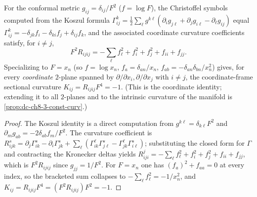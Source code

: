 \begin{lemma}
  \label{lem:dc-ch8-3-conformal-curvature}
  \leanok
  For the conformal metric $g_{ij}=\delta_{ij}/F^2$ ($f=\log F$), the Christoffel
  symbols computed from the Koszul formula
  $\Gamma^k_{ij}=\tfrac12\sum_\ell g^{k\ell}(\partial_i g_{j\ell}+\partial_j g_{i\ell}-\partial_\ell g_{ij})$
  equal $\Gamma^k_{ij}=-\delta_{jk}f_i-\delta_{ki}f_j+\delta_{ij}f_k$, and the
  associated coordinate curvature coefficients satisfy, for $i\neq j$,
  $$F^2R_{ijij}=-\sum_\ell f_\ell^2+f_i^2+f_j^2+f_{ii}+f_{jj}.$$
  Specializing to $F=x_n$ (so $f=\log x_n$, $f_a=\delta_{an}/x_n$,
  $f_{ab}=-\delta_{an}\delta_{bn}/x_n^2$) gives, for every \emph{coordinate}
  $2$-plane spanned by $\partial/\partial x_i,\partial/\partial x_j$ with $i\neq j$,
  the coordinate-frame sectional curvature $K_{ij}=R_{ijij}F^4=-1$. (This is the
  coordinate identity; extending it to all $2$-planes and to the intrinsic
  curvature of the manifold is \cref{prop:dc-ch8-3-const-curv}.)
\end{lemma}
\begin{proof}
  \leanok
  The Koszul identity is a direct computation from
  $g^{k\ell}=\delta_{k\ell}F^2$ and $\partial_m g_{ab}=-2\delta_{ab}f_m/F^2$.
  The curvature coefficient is
  $R^s_{ijk}=\partial_j\Gamma^s_{ik}-\partial_i\Gamma^s_{jk}+\sum_\ell(\Gamma^\ell_{ik}\Gamma^s_{j\ell}-\Gamma^\ell_{jk}\Gamma^s_{i\ell})$;
  substituting the closed form for $\Gamma$ and contracting the Kronecker deltas
  yields $R^j_{iji}=-\sum_\ell f_\ell^2+f_i^2+f_j^2+f_{ii}+f_{jj}$, which is
  $F^2R_{ijij}$ since $g_{jj}=1/F^2$. For $F=x_n$ one has
  $(f_a)^2+f_{aa}=0$ at every index, so the bracketed sum collapses to
  $-\sum_\ell f_\ell^2=-1/x_n^2$, and $K_{ij}=R_{ijij}F^4=(F^2R_{ijij})F^2=-1$.
\end{proof}

